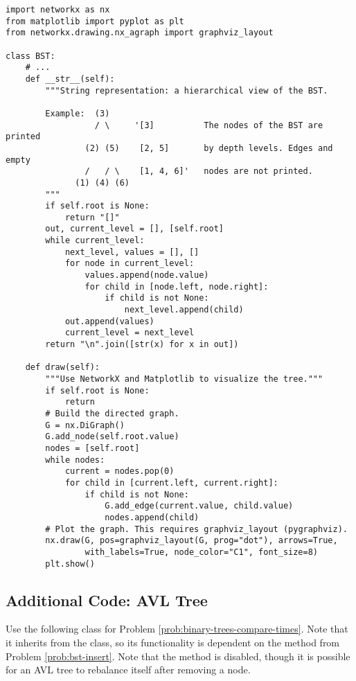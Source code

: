 \begin{lstlisting}
import networkx as nx
from matplotlib import pyplot as plt
from networkx.drawing.nx_agraph import graphviz_layout

class BST:
    # ...
    def __str__(self):
        """String representation: a hierarchical view of the BST.

        Example:  (3)
                  / \     '[3]          The nodes of the BST are printed
                (2) (5)    [2, 5]       by depth levels. Edges and empty
                /   / \    [1, 4, 6]'   nodes are not printed.
              (1) (4) (6)
        """
        if self.root is None:
            return "[]"
        out, current_level = [], [self.root]
        while current_level:
            next_level, values = [], []
            for node in current_level:
                values.append(node.value)
                for child in [node.left, node.right]:
                    if child is not None:
                        next_level.append(child)
            out.append(values)
            current_level = next_level
        return "\n".join([str(x) for x in out])

    def draw(self):
        """Use NetworkX and Matplotlib to visualize the tree."""
        if self.root is None:
            return
        # Build the directed graph.
        G = nx.DiGraph()
        G.add_node(self.root.value)
        nodes = [self.root]
        while nodes:
            current = nodes.pop(0)
            for child in [current.left, current.right]:
                if child is not None:
                    G.add_edge(current.value, child.value)
                    nodes.append(child)
        # Plot the graph. This requires graphviz_layout (pygraphviz).
        nx.draw(G, pos=graphviz_layout(G, prog="dot"), arrows=True,
                with_labels=True, node_color="C1", font_size=8)
        plt.show()
\end{lstlisting}

\subsection*{Additional Code: AVL Tree} %

Use the following class for Problem \ref{prob:binary-trees-compare-times}.
Note that it inherits from the  class, so its functionality is dependent on the  method from Problem \ref{prob:bst-insert}.
Note that the  method is disabled, though it is possible for an AVL tree to rebalance itself after removing a node.

